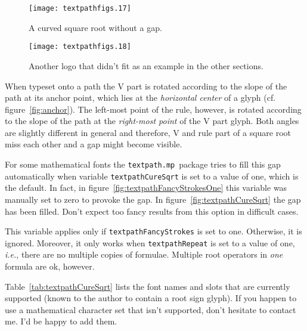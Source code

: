 \documentclass{article}
\newcommand*{\cmd}[1]{\texttt{#1}}
\newcommand*{\pkg}{\cmd{textpath.mp}}
\begin{document}
\begin{figure}
\begin{minipage}[t]{.45\linewidth}
  \centering
  \texttt{[image: textpathfigs.17]}
  \caption{A curved square root without a gap.}
  \label{fig:textpathCureSqrt}
\end{minipage}\hfill
\begin{minipage}[t]{.45\linewidth}
  \centering
  \texttt{[image: textpathfigs.18]}
  \caption{Another logo that didn't fit as an example in the other sections.}
  \label{fig:proetcontra}
\end{minipage}
\end{figure}

When typeset onto a path the V part is rotated according to the slope of the path at its anchor point, which lies at the \emph{horizontal center} of a glyph (cf. figure~\ref{fig:anchor}).  The left-most point of the rule, however, is rotated according to the slope of the path at the \emph{right-most point} of the V part glyph.  Both angles are slightly different in general and therefore, V and rule part of a square root miss each other and a gap might become visible.

For some mathematical fonts the \pkg\ package tries to fill this gap automatically when variable \cmd{textpathCureSqrt} is set to a value of one, which is the default.  In fact, in figure~\ref{fig:textpathFancyStrokesOne} this variable was manually set to zero to provoke the gap.  In figure~\ref{fig:textpathCureSqrt} the gap has been filled.  Don't expect too fancy results from this option in difficult cases.

This variable applies only if \cmd{textpathFancyStrokes} is set to one.  Otherwise, it is ignored. Moreover, it only works when \cmd{textpathRepeat} is set to a value of one, \emph{i.e.}, there are no multiple copies of formulae.  Multiple root operators in \emph{one} formula are ok, however.

Table~\ref{tab:textpathCureSqrt} lists the font names and slots that are currently supported (known to the author to contain a root sign glyph).  If you happen to use a mathematical character set that isn't supported, don't hesitate to contact me.  I'd be happy to add them.
\end{document}
